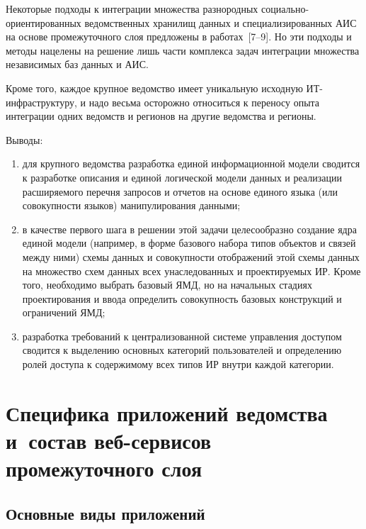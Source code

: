\begin{multicols}{2}
Некоторые подходы к интеграции множества 
разнородных социально-ориентированных ведомственных хранилищ данных и 
специализированных АИС на основе промежуточного слоя предложены в работах~[7--9]. Но 
эти подходы и методы нацелены на решение лишь части комплекса задач интеграции 
множества независимых баз данных и АИС. 

Кроме того, каждое крупное ведомство имеет 
уникальную исходную ИТ-ин\-фра\-струк\-ту\-ру, и надо весьма осторожно относиться к переносу 
опыта интеграции одних ведомств и регионов на другие ведомства и регионы. 

\bigskip
      
      Выводы:
      \begin{enumerate}[(1)]
\item для крупного ведомства разработка единой информационной модели сводится к 
разработке описания и единой логической модели данных и реализации расширяемого 
перечня запросов и отчетов на основе единого языка (или совокупности языков) 
манипулирования данными;
\item в качестве первого шага в решении этой задачи целесообразно создание ядра 
единой модели (например, в форме базового набора типов объектов и связей между 
ними) схемы данных и совокупности отображений этой схемы данных на множество 
схем данных всех унаследованных и проектируемых ИР. Кроме того, необходимо 
выбрать базовый ЯМД, но на начальных стадиях 
проектирования и ввода определить совокупность базовых конструкций и 
ограничений ЯМД; 
\item разработка требований к централизованной системе управления доступом сводится к 
выделению основных категорий пользователей и определению ролей доступа к содержимому 
всех типов ИР внутри каждой категории.
\end{enumerate}


\section{Специфика приложений ведомства и~состав веб-сервисов 
промежуточного слоя }

\subsection{Основные виды приложений}


\end{multicols}
